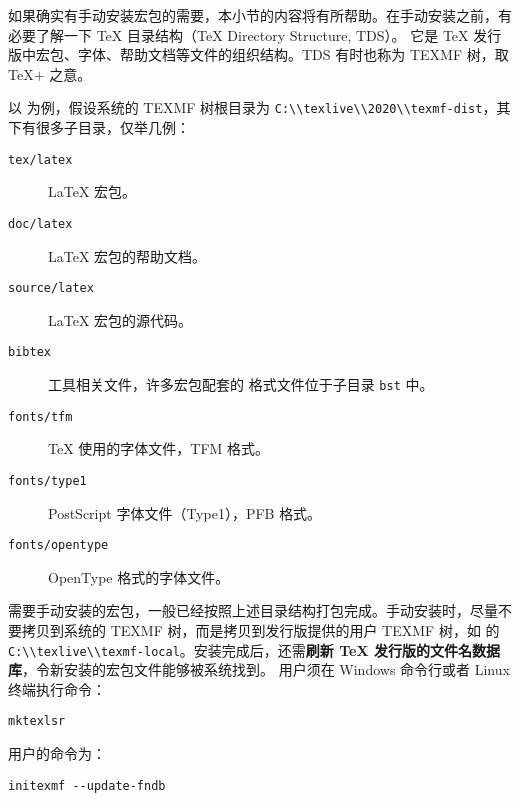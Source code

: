 如果确实有手动安装宏包的需要，本小节的内容将有所帮助。在手动安装之前，有必要了解一下 \TeX{} 目录结构（\TeX{} Directory Structure, TDS）。
它是 \TeX{} 发行版中宏包、字体、帮助文档等文件的组织结构。TDS 有时也称为 TEXMF 树，取 \TeX$+$ 之意。

以  为例，假设系统的 TEXMF 树根目录为 \nolinkurl{C:\\texlive\\2020\\texmf-dist}，其下有很多子目录，仅举几例：
\begin{description}
  \item[\texttt{tex/latex}] \LaTeX{} 宏包。
  \item[\texttt{doc/latex}] \LaTeX{} 宏包的帮助文档。
  \item[\texttt{source/latex}] \LaTeX{} 宏包的源代码。
  \item[\texttt{bibtex}]  工具相关文件，许多宏包配套的  格式文件位于子目录 \texttt{bst} 中。
  \item[\texttt{fonts/tfm}] \TeX{} 使用的字体文件，TFM 格式。
  \item[\texttt{fonts/type1}] PostScript 字体文件（Type1），PFB 格式。
  \item[\texttt{fonts/opentype}] OpenType 格式的字体文件。
\end{description}

需要手动安装的宏包，一般已经按照上述目录结构打包完成。手动安装时，尽量不要拷贝到系统的 TEXMF 树，而是拷贝到发行版提供的用户 TEXMF 树，如
 的 \nolinkurl{C:\\texlive\\texmf-local}。安装完成后，还需\textbf{刷新 \TeX{} 发行版的文件名数据库}，令新安装的宏包文件能够被系统找到。
 用户须在 Windows 命令行或者 Linux 终端执行命令：
\begin{verbatim}
mktexlsr
\end{verbatim}
 用户的命令为：
\begin{verbatim}
initexmf --update-fndb
\end{verbatim}

\endinput
